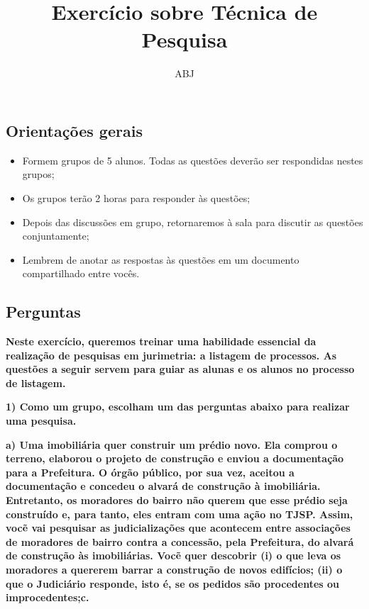 \documentclass[
  letterpaper,
  DIV=11,
  numbers=noendperiod]{scrartcl}
\title{Exercício sobre Técnica de Pesquisa}
\author{ABJ}
\date{}
\providecommand{\tightlist}{%
  \setlength{\itemsep}{0pt}\setlength{\parskip}{0pt}}\usepackage{longtable,booktabs,array}
\begin{document}
\maketitle
\ifdefined\Shaded\renewenvironment{Shaded}{\begin{tcolorbox}[borderline west={3pt}{0pt}{shadecolor}, breakable, interior hidden, frame hidden, enhanced, sharp corners, boxrule=0pt]}{\end{tcolorbox}}\fi

\hypertarget{orientauxe7uxf5es-gerais}{%
\subsection{Orientações gerais}\label{orientauxe7uxf5es-gerais}}

\begin{itemize}
\tightlist
\item
  Formem grupos de 5 alunos. Todas as questões deverão ser respondidas
  nestes grupos;
\item
  Os grupos terão 2 horas para responder às questões;
\item
  Depois das discussões em grupo, retornaremos à sala para discutir as
  questões conjuntamente;
\item
  Lembrem de anotar as respostas às questões em um documento
  compartilhado entre vocês.
\end{itemize}

\newpage{}

\hypertarget{perguntas}{%
\subsection{Perguntas}\label{perguntas}}

\textbf{Neste exercício, queremos treinar uma habilidade essencial da
realização de pesquisas em jurimetria: a listagem de processos. As
questões a seguir servem para guiar as alunas e os alunos no processo de
listagem.}

\textbf{1) Como um grupo, escolham um das perguntas abaixo para realizar
uma pesquisa.}

\textbf{a) Uma imobiliária quer construir um prédio novo. Ela comprou o
terreno, elaborou o projeto de construção e enviou a documentação para a
Prefeitura. O órgão público, por sua vez, aceitou a documentação e
concedeu o alvará de construção à imobiliária. Entretanto, os moradores
do bairro não querem que esse prédio seja construído e, para tanto, eles
entram com uma ação no TJSP. Assim, vocẽ vai pesquisar as
judicializações que acontecem entre associações de moradores de bairro
contra a concessão, pela Prefeitura, do alvará de construção às
imobiliárias. Vocẽ quer descobrir (i) o que leva os moradores a quererem
barrar a construção de novos edifícios; (ii) o que o Judiciário
responde, isto é, se os pedidos são procedentes ou improcedentes;c.}
\end{document}
